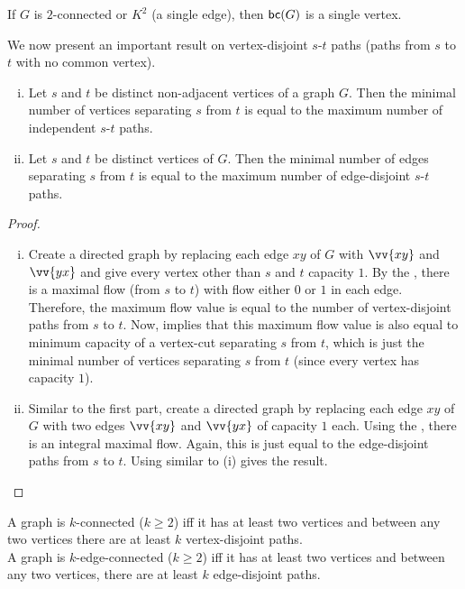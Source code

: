 If $G$ is $2$-connected or $K^2$ (a single edge), then $\mathsf{bc}(G)$ is a single vertex.

We now present an important result on vertex-disjoint $s$-$t$ paths (paths from $s$ to $t$ with no common vertex).
\begin{ftheo}
\label{menger's theorem}
\phantom{owo}
\begin{enumerate}[(i)]
    \item Let $s$ and $t$ be distinct non-adjacent vertices of a graph $G$. Then the minimal number of vertices separating $s$ from $t$ is equal to the maximum number of independent $s$-$t$ paths.
    \item Let $s$ and $t$ be distinct vertices of $G$. Then the minimal number of edges separating $s$ from $t$ is equal to the maximum number of edge-disjoint $s$-$t$ paths.
\end{enumerate}
\end{ftheo}
\begin{proof}\phantom{owo}
\begin{enumerate}[(i)]
    \item Create a directed graph by replacing each edge $xy$ of $G$ with $\vv{xy}$ and $\vv{yx}$ and give every vertex other than $s$ and $t$ capacity $1$. By the , there is a maximal flow (from $s$ to $t$) with flow either $0$ or $1$ in each edge. Therefore, the maximum flow value is equal to the number of vertex-disjoint paths from $s$ to $t$. Now,  implies that this maximum flow value is also equal to minimum capacity of a vertex-cut separating $s$ from $t$, which is just the minimal number of vertices separating $s$ from $t$ (since every vertex has capacity $1$).
    
    \item Similar to the first part, create a directed graph by replacing each edge $xy$ of $G$ with two edges $\vv{xy}$ and $\vv{yx}$ of capacity $1$ each. Using the , there is an integral maximal flow. Again, this is just equal to the edge-disjoint paths from $s$ to $t$. Using  similar to (i) gives the result.
\end{enumerate}
\end{proof}

\begin{corollary}
A graph is $k$-connected ($k\geq 2$) iff it has at least two vertices and between any two vertices there are at least $k$ vertex-disjoint paths.\\
A graph is $k$-edge-connected ($k\geq 2$) iff it has at least two vertices and between any two vertices, there are at least $k$ edge-disjoint paths.
\end{corollary}

